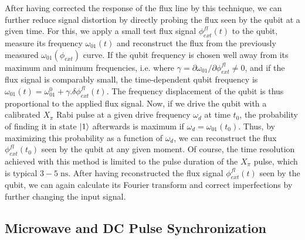 After having corrected the response of the flux line by this technique, we can further reduce signal distortion by directly probing the flux seen by the qubit at a given time. For this, we apply a small test flux signal $\phi_{ext}^{fl}(t)$ to the qubit, measure its frequency $\omega_{01}(t)$ and reconstruct the flux from the previously measured  $\omega_{01}(\phi_{ext})$ curve. If the qubit frequency is chosen well away from its maximum and minimum frequencies, i.e. where $\gamma=\partial \omega_{01}/\partial \phi_{ext}^{fl} \ne 0$, and if the flux signal is comparably small, the time-dependent qubit frequency is $\omega_{01}(t)=\omega_{01}^0+\gamma.\delta\phi_{ext}^{fl}(t)$. The frequency displacement of the qubit is thus proportional to the applied flux signal. Now, if we drive the qubit with a calibrated $X_\pi$ Rabi pulse at a given drive frequency $\omega_{d}$ at time $t_0$, the probability of finding it in state $\left| 1 \right>$ afterwards is maximum if $\omega_{d}=\omega_{01}(t_0)$. Thus, by maximizing this probability as a function of $\omega_{d}$, we can reconstruct the flux $\phi_{ext}^{fl}(t_0)$ seen by the qubit at any given moment. Of course, the time resolution achieved with this method is limited to the pulse duration of the $X_\pi$ pulse, which is typical $3-5\;\mathrm{ns}$. After having reconstructed the flux signal $\phi_{ext}^{fl}(t)$ seen by the qubit, we can again calculate its Fourier transform and correct imperfections by further changing the input signal.

\subsection{Microwave and DC Pulse Synchronization}

